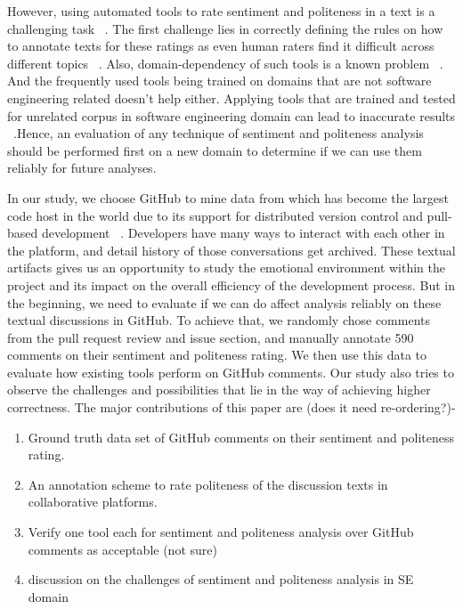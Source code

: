 However, using automated tools to rate sentiment and politeness in a text is a challenging task ~\cite{montoyo2012subjectivity}. The first challenge lies in correctly defining the rules on how to annotate texts for these ratings as even human raters find it difficult across different topics ~\cite{wiebe2005annotating}. Also, domain-dependency of such tools is a known problem ~\cite{novielli2015challenges,gamon2005pulse}. And the frequently used tools being trained on domains that are not software engineering related doesn't help either. Applying tools that are trained and tested for unrelated corpus in software engineering domain can lead to inaccurate results ~\cite{jongeling2017negative,ahmed2017senticr}.Hence, an evaluation of any technique of sentiment and politeness analysis should be performed first on a new domain to determine if we can use them reliably for future analyses.  

In our study, we choose GitHub to mine data from which has become the largest code host in the world due to its support for distributed version control and pull-based development ~\cite{gousios2014lean}. Developers have many ways to interact with each other in the platform, and detail history of those conversations get archived. These textual artifacts gives us an opportunity to study the emotional environment within the project and its impact on the overall efficiency of the development process. But in the beginning, we need to evaluate if we can do affect analysis reliably on these textual discussions in GitHub. To achieve that, we randomly chose comments from the pull request review and issue section, and manually annotate 590 comments on their sentiment and politeness rating. We then use this data to evaluate how existing tools perform on GitHub comments. Our study also tries to observe the challenges and possibilities that lie in the way of achieving higher correctness.
\newline
\newline
The major contributions of this paper are (does it need re-ordering?)-
\begin{enumerate}
    \item Ground truth data set of GitHub comments on their sentiment and politeness rating.
    \item An annotation scheme to rate politeness of the discussion texts in collaborative platforms.
    \item Verify one tool each for sentiment and politeness analysis over GitHub comments as acceptable (not sure)
    \item discussion on the challenges of sentiment and politeness analysis in SE domain
\end{enumerate}





